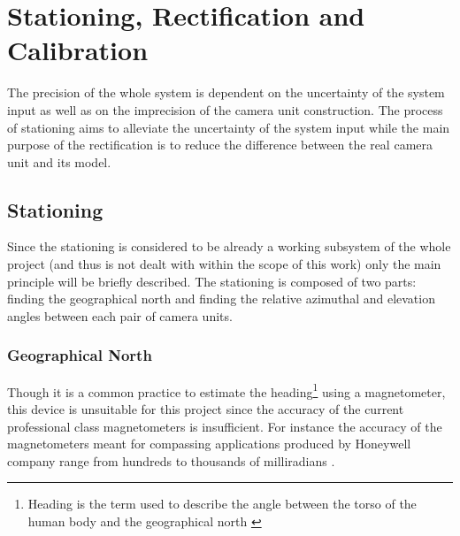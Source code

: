 \chapter{Stationing, Rectification and Calibration} \label{txt:stationing_and_rectification}

The precision of the whole system is dependent on the uncertainty of the system input as well as on the imprecision of the camera unit construction. The process of stationing aims to alleviate the uncertainty of the system input while the main purpose of the rectification is to reduce the difference between the real camera unit and its model.

\section{Stationing}

Since the stationing is considered to be already a working subsystem of the whole project (and thus is not dealt with within the scope of this work) only the main principle will be briefly described. The stationing is composed of two parts: finding the geographical north and finding the relative azimuthal and elevation angles between each pair of camera units.

\subsection{Geographical North} \label{txt:geographical_north}

Though it is a common practice to estimate the heading\footnote{Heading is the term used to describe the angle between the torso of the human body and the geographical north \cite{Henriksson648760}} using a magnetometer, this device is unsuitable for this project since the accuracy of the current professional class magnetometers is insufficient. For instance the accuracy of the magnetometers meant for compassing applications produced by Honeywell company range from hundreds to thousands of milliradians \cite{Honeywell:compassing_catalog}.

